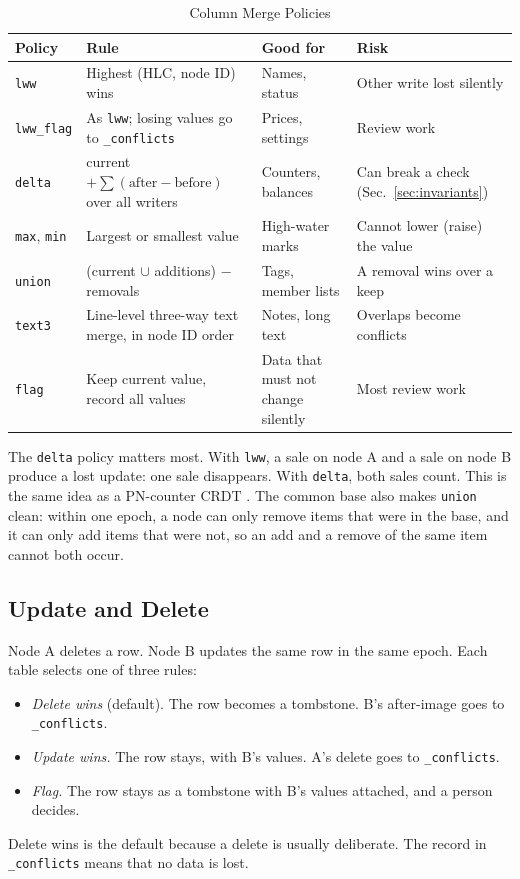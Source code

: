 \documentclass[journal]{IEEEtran}
\newcommand{\code}[1]{\texttt{#1}}
\begin{document}
\begin{table}[t]
\caption{Column Merge Policies}\label{tab:policies}
\centering\footnotesize
\begin{tabular}{@{}l L{2.9cm} L{1.5cm} L{1.8cm}@{}}
\toprule
Policy & Rule & Good for & Risk\\
\midrule
\code{lww} & Highest (HLC, node ID) wins & Names, status & Other write lost silently\\
\code{lww\_flag} & As \code{lww}; losing values go to \code{\_conflicts} & Prices, settings & Review work\\
\code{delta} & current $+\sum(\text{after}-\text{before})$ over all writers & Counters, balances & Can break a check (Sec.~\ref{sec:invariants})\\
\code{max}, \code{min} & Largest or smallest value & High-water marks & Cannot lower (raise) the value\\
\code{union} & (current $\cup$ additions) $-$ removals & Tags, member lists & A removal wins over a keep\\
\code{text3} & Line-level three-way text merge, in node ID order & Notes, long text & Overlaps become conflicts\\
\code{flag} & Keep current value, record all values & Data that must not change silently & Most review work\\
\bottomrule
\end{tabular}
\end{table}

The \code{delta} policy matters most. With \code{lww}, a sale on node A and a sale on node B produce a lost update: one sale disappears. With \code{delta}, both sales count. This is the same idea as a PN-counter CRDT \cite{shapiro2011}. The common base also makes \code{union} clean: within one epoch, a node can only remove items that were in the base, and it can only add items that were not, so an add and a remove of the same item cannot both occur.

\subsection{Update and Delete}\label{sec:delete}
Node A deletes a row. Node B updates the same row in the same epoch. Each table selects one of three rules:
\begin{itemize}
\item \emph{Delete wins} (default). The row becomes a tombstone. B's after-image goes to \code{\_conflicts}.
\item \emph{Update wins.} The row stays, with B's values. A's delete goes to \code{\_conflicts}.
\item \emph{Flag.} The row stays as a tombstone with B's values attached, and a person decides.
\end{itemize}
Delete wins is the default because a delete is usually deliberate. The record in \code{\_conflicts} means that no data is lost.
\end{document}
